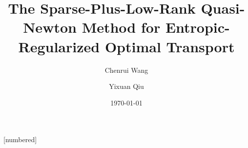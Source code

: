 
[numbered]

\title[The Sparse Plus Low Rank Method]{The Sparse-Plus-Low-Rank Quasi-Newton Method for Entropic-Regularized Optimal Transport}
\author[Wang et al.]{
    Chenrui Wang \and
    Yixuan Qiu
}


\date{\today}

